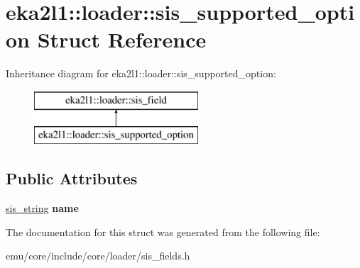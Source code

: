 \hypertarget{structeka2l1_1_1loader_1_1sis__supported__option}{}\section{eka2l1\+:\+:loader\+:\+:sis\+\_\+supported\+\_\+option Struct Reference}
\label{structeka2l1_1_1loader_1_1sis__supported__option}
Inheritance diagram for eka2l1\+:\+:loader\+:\+:sis\+\_\+supported\+\_\+option\+:\begin{figure}[H]
\begin{center}
\leavevmode
\includegraphics[height=2.000000cm]{structeka2l1_1_1loader_1_1sis__supported__option}
\end{center}
\end{figure}
\subsection*{Public Attributes}
\begin{DoxyCompactItemize}
\item 
\mbox{\label{structeka2l1_1_1loader_1_1sis__supported__option_a8420b4a6689ea1f1aac1eee2c5af1ab1}} 
\mbox{\hyperlink{structeka2l1_1_1loader_1_1sis__string}{sis\+\_\+string}} {\bfseries name}
\end{DoxyCompactItemize}


The documentation for this struct was generated from the following file\+:\begin{DoxyCompactItemize}
\item 
emu/core/include/core/loader/sis\+\_\+fields.\+h\end{DoxyCompactItemize}
